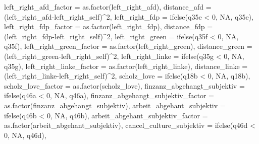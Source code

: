 \documentclass[
]{article}
\newenvironment{Shaded}{\begin{snugshade}}{\end{snugshade}}
\newcommand{\AttributeTok}[1]{\textcolor[rgb]{0.77,0.63,0.00}{#1}}
\newcommand{\ConstantTok}[1]{\textcolor[rgb]{0.00,0.00,0.00}{#1}}
\newcommand{\DecValTok}[1]{\textcolor[rgb]{0.00,0.00,0.81}{#1}}
\newcommand{\FunctionTok}[1]{\textcolor[rgb]{0.00,0.00,0.00}{#1}}
\newcommand{\NormalTok}[1]{#1}
\newcommand{\SpecialCharTok}[1]{\textcolor[rgb]{0.00,0.00,0.00}{#1}}
\begin{document}
\begin{Shaded}
\begin{Highlighting}[]
         \AttributeTok{left\_right\_afd\_factor =} \FunctionTok{as.factor}\NormalTok{(left\_right\_afd),}
         \AttributeTok{distance\_afd =}\NormalTok{ (left\_right\_afd}\SpecialCharTok{{-}}\NormalTok{left\_right\_self)}\SpecialCharTok{\^{}}\DecValTok{2}\NormalTok{,}
         \AttributeTok{left\_right\_fdp =} \FunctionTok{ifelse}\NormalTok{(q35e }\SpecialCharTok{\textless{}} \DecValTok{0}\NormalTok{, }\ConstantTok{NA}\NormalTok{, q35e),}
         \AttributeTok{left\_right\_fdp\_factor =} \FunctionTok{as.factor}\NormalTok{(left\_right\_fdp),}
         \AttributeTok{distance\_fdp =}\NormalTok{ (left\_right\_fdp}\SpecialCharTok{{-}}\NormalTok{left\_right\_self)}\SpecialCharTok{\^{}}\DecValTok{2}\NormalTok{,}
         \AttributeTok{left\_right\_green =} \FunctionTok{ifelse}\NormalTok{(q35f }\SpecialCharTok{\textless{}} \DecValTok{0}\NormalTok{, }\ConstantTok{NA}\NormalTok{, q35f),}
         \AttributeTok{left\_right\_green\_factor =} \FunctionTok{as.factor}\NormalTok{(left\_right\_green),}
         \AttributeTok{distance\_green =}\NormalTok{ (left\_right\_green}\SpecialCharTok{{-}}\NormalTok{left\_right\_self)}\SpecialCharTok{\^{}}\DecValTok{2}\NormalTok{,}
         \AttributeTok{left\_right\_linke =} \FunctionTok{ifelse}\NormalTok{(q35g }\SpecialCharTok{\textless{}} \DecValTok{0}\NormalTok{, }\ConstantTok{NA}\NormalTok{, q35g),}
         \AttributeTok{left\_right\_linke\_factor =} \FunctionTok{as.factor}\NormalTok{(left\_right\_linke),}
         \AttributeTok{distance\_linke =}\NormalTok{ (left\_right\_linke}\SpecialCharTok{{-}}\NormalTok{left\_right\_self)}\SpecialCharTok{\^{}}\DecValTok{2}\NormalTok{,}
         \AttributeTok{scholz\_love =} \FunctionTok{ifelse}\NormalTok{(q18b }\SpecialCharTok{\textless{}} \DecValTok{0}\NormalTok{, }\ConstantTok{NA}\NormalTok{, q18b),}
         \AttributeTok{scholz\_love\_factor =} \FunctionTok{as.factor}\NormalTok{(scholz\_love),}
         \AttributeTok{finzanz\_abgehangt\_subjektiv =} \FunctionTok{ifelse}\NormalTok{(q46a }\SpecialCharTok{\textless{}} \DecValTok{0}\NormalTok{, }\ConstantTok{NA}\NormalTok{, q46a),}
         \AttributeTok{finzanz\_abgehangt\_subjektiv\_factor =} \FunctionTok{as.factor}\NormalTok{(finzanz\_abgehangt\_subjektiv),}
         \AttributeTok{arbeit\_abgehant\_subjektiv =} \FunctionTok{ifelse}\NormalTok{(q46b }\SpecialCharTok{\textless{}} \DecValTok{0}\NormalTok{, }\ConstantTok{NA}\NormalTok{, q46b),}
         \AttributeTok{arbeit\_abgehant\_subjektiv\_factor =} \FunctionTok{as.factor}\NormalTok{(arbeit\_abgehant\_subjektiv),}
         \AttributeTok{cancel\_culture\_subjektiv =} \FunctionTok{ifelse}\NormalTok{(q46d }\SpecialCharTok{\textless{}} \DecValTok{0}\NormalTok{, }\ConstantTok{NA}\NormalTok{, q46d),}

\end{Highlighting}
\end{Shaded}
\end{document}
